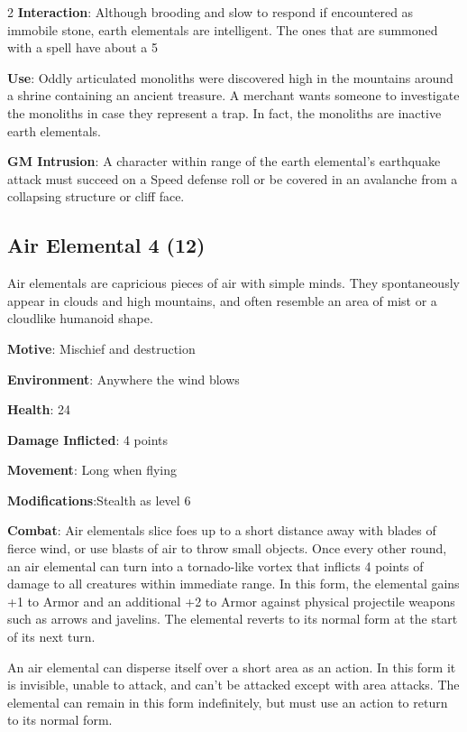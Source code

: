 \begin{multicols}{2}
\textbf{Interaction}: Although brooding and slow to respond if encountered as immobile stone, earth elementals are intelligent. The ones that are summoned with a spell have about a 5%

\textbf{Use}: Oddly articulated monoliths were discovered high in the mountains around a shrine containing an ancient treasure. A merchant wants someone to investigate the monoliths in case they represent a trap. In fact, the monoliths are inactive earth elementals.

\textbf{GM Intrusion}: A character within range of the earth elemental’s earthquake attack must succeed on a Speed defense roll or be covered in an avalanche from a collapsing structure or cliff face.

\subsection{Air Elemental 4 (12)}

Air elementals are capricious pieces of air with simple minds. They spontaneously appear in clouds and high mountains, and often resemble an area of mist or a cloudlike humanoid shape. 

\textbf{Motive}: Mischief and destruction 

\textbf{Environment}: Anywhere the wind blows 

\textbf{Health}: 24 

\textbf{Damage Inflicted}: 4 points 

\textbf{Movement}: Long when flying 

\textbf{Modifications}:Stealth as level 6 

\textbf{Combat}: Air elementals slice foes up to a short distance away with blades of fierce wind, or use blasts of air to throw small objects. Once every other round, an air elemental can turn into a tornado-like vortex that inflicts 4 points of damage to all creatures within immediate range. In this form, the elemental gains +1 to Armor and an additional +2 to Armor against physical projectile weapons such as arrows and javelins. The elemental reverts to its normal form at the start of its next turn. 

An air elemental can disperse itself over a short area as an action. In this form it is invisible, unable to attack, and can’t be attacked except with area attacks. The elemental can remain in this form indefinitely, but must use an action to return to its normal form. 


\end{multicols}
